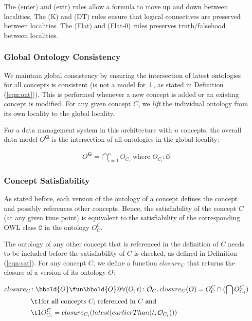 \documentclass[preprint,12pt]{elsarticle}
\begin{document}
The (enter) and (exit) rules allow a formula to move up and down between localities. The (K) and (DT) rules ensure that logical connectives are preserved between localities. The (Flat) and (Flat-0) rules preserves truth/falsehood between localities.

\subsubsection{Global Ontology Consistency}
We maintain global consistency by ensuring the intersection of latest ontologies for all concepts is consistent (is not a model for $\bot$, as stated in Definition (\ref{eqn:ont})). This is performed whenever a new concept is added or an existing concept is modified. For any given concept $C$, we \emph{lift} the individual ontology from its own locality to the global locality. %

For a data management system in this architecture with $n$ concepts, the overall data model $O^\mathbf{G}$ is the intersection of all ontologies in the global locality:

\begin{align}
O^\mathbf{G} = \bigcap_{i=1}^n O_{C_i} \text{ where } O_{C_i}\colon \mathcal{O}
\end{align}

\subsubsection{Concept Satisfiability}
As stated before, each version of the ontology of a concept defines the concept and possibly references other concepts. Hence, the satisfiability of the concept $C$ (at any given time point) is equivalent to the satisfiability of the corresponding OWL class $\mathtt{C}$ in the ontology $O_C^C$. 

The ontology of any other concept that is referenced in the definition of $C$ needs to be included before the satisfiability of $C$ is checked, as defined in Definition (\ref{eqn:sat}). For any concept $C$, we define a function $closure_C$ that returns the closure of a version of its ontology $O$:

\begin{align}
closure_C&\colon \bbold{O}\fun\bbold{O} @ \forall (O,t)\colon\mathcal{O}_C, closure_C(O) = O_C^C \cap (\bigcap O_{C_i}^C)\label{eqn:aug_ont}\\
    &\t1 \text{for all concepts $C_i$ referenced in $C$ and}\nonumber\\
    &\t1 O_{C_i}^C = closure_{C_i}(latest(earlierThan(t, \mathcal{O}_{C_i})))\nonumber
\end{align}
\end{document}

